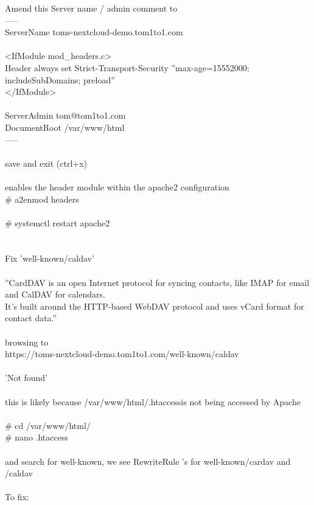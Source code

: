 \documentclass[10pt,a4paper]{article}
\begin{document}
{		Amend this Server name / admin comment to\\
		-----\\
		ServerName toms-nextcloud-demo.tom1to1.com\\
\\
    		<IfModule mod\_headers.c>\\
      			Header always set Strict-Transport-Security ''max-age=15552000; includeSubDomains; preload''\\
    		</IfModule>\\
	\\
		ServerAdmin tom@tom1to1.com}{\large \\
		DocumentRoot /var/www/html}{\large \\
		-----\\
	\\
		save and exit  (ctrl+x)\\
\\
		enables the header module within the apache2 configuration\\
		\# a2enmod headers\\
\\
		\# systemctl restart apache2\\
\\
		\\
	Fix 'well-known/caldav'\\
\\
		''CardDAV is an open Internet protocol for syncing contacts, like IMAP for email and CalDAV for calendars.\\
		It’s built around the HTTP-based WebDAV protocol and uses vCard format for contact data.''\\
\\
		browsing to \\
		https://toms-nextcloud-demo.tom1to1.com/well-known/caldav}{\large \\
\\
		'Not found'\\
\\
		this is likely because /var/www/html/.htaccess}{\large  is not being accessed by Apache\\
\\
		\# cd /var/www/html/}{\large \\
		\# nano .htaccess\\
\\
		and search for well-known, we see RewriteRule 's for well-known/cardav and /caldav\\
\\
		To fix:\\
}
\end{document}
